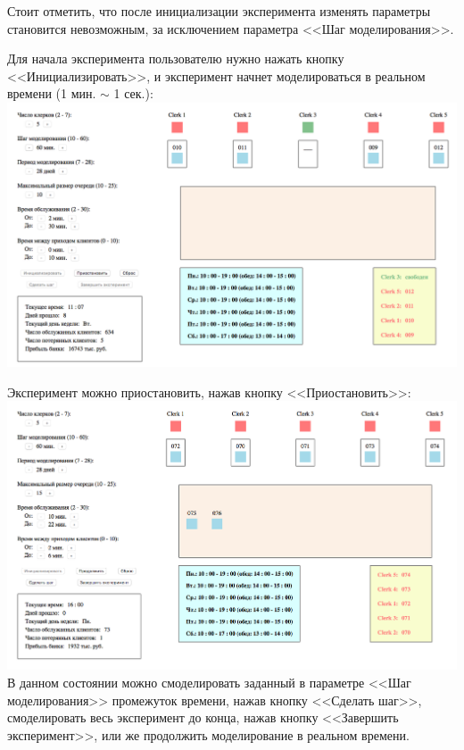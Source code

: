 \documentclass[oneside,final,12pt]{article}
\begin{document}
 Стоит отметить, что после инициализации эксперимента изменять параметры становится невозможным, за исключением параметра <<Шаг моделирования>>.\\
 
 \newpage
 
 Для начала эксперимента пользователю нужно нажать кнопку <<Инициализировать>>, и эксперимент начнет моделироваться в реальном времени (1 мин. $\sim$ 1 сек.):\\
 
 \includegraphics[width=150mm]{processing.png}\\

 \newpage
 
Эксперимент можно приостановить, нажав кнопку <<Приостановить>>:\\

 \includegraphics[width=150mm]{paused.png}\\

В данном состоянии можно смоделировать заданный в параметре <<Шаг моделирования>> промежуток времени, нажав кнопку <<Сделать шаг>>, смоделировать весь эксперимент до конца, нажав кнопку <<Завершить эксперимент>>, или же продолжить моделирование в реальном времени.\\
\end{document}
